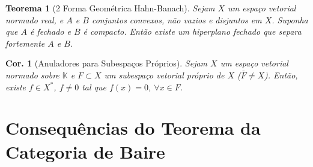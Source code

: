 \documentclass[11pt]{article}
\theoremstyle{yellowhead}
\newtheorem*{theorem}{Teorema}
\newtheorem*{corollary}{Cor.}
\theoremstyle{yellowdef}
\begin{document}
\begin{multicols}{3}
\begin{theorem}[2 Forma Geométrica Hahn-Banach]
Sejam $X$ um espaço vetorial normado real, e $A$ e $B$ conjuntos convexos, não vazios e disjuntos em $X$. Suponha que $A$ é fechado e $B$ é compacto. Então existe um hiperplano fechado que separa fortemente $A$ e $B$.
\end{theorem}

\begin{corollary}[Anuladores para Subespaços Próprios]
Sejam $X$ um espaço vetorial normado sobre $\mathbb{K}$ e $F \subset X$ um subespaço vetorial próprio de $X$ ($\bar{F} \neq X$). Então, existe $f \in X^*$, $f \neq 0$ tal que $f(x) = 0$, $\forall x \in F$.
\end{corollary}
\end{multicols}

\section{Consequências do Teorema da Categoria de Baire}
\end{document}
